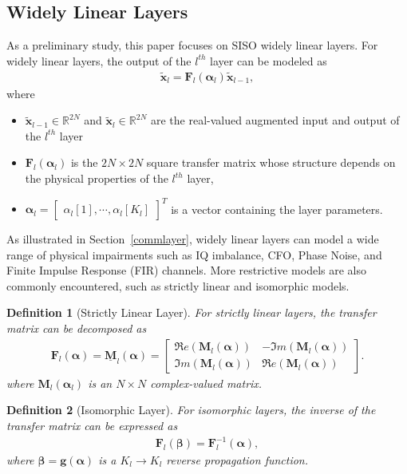 \documentclass{article}
\newtheorem{definition}{Definition}
\begin{document}
\subsection{Widely Linear Layers}

As a preliminary study, this paper focuses on SISO widely linear layers. For widely linear layers, the output of the $l^{th}$ layer can be modeled as
\begin{align}
\tilde{\mathbf{x}}_l = \mathbf{F}_l(\boldsymbol \alpha_l)\tilde{\mathbf{x}}_{l-1}\label{eqmod1},
\end{align}
where 
\begin{itemize}
\item $\tilde{\mathbf{x}}_{l-1}\in \mathbb{R}^{2N}$ and $\tilde{\mathbf{x}}_{l}\in \mathbb{R}^{2N}$ are the real-valued augmented input and output of the $l^{th}$ layer
\item $\mathbf{F}_l(\boldsymbol  \alpha_l)$ is the $2N\times 2N$ square transfer matrix whose structure depends on the physical properties of the $l^{th}$ layer,
\item $\boldsymbol  \alpha_l=\begin{bmatrix}\alpha_l[1],\cdots, \alpha_l[K_l]\end{bmatrix}^T$ is a vector containing the layer parameters.
\end{itemize}

As illustrated in Section~\ref{commlayer}, widely linear layers can model a wide range of physical impairments such as IQ imbalance, CFO, Phase Noise, and Finite Impulse Response (FIR) channels. More restrictive models are also commonly encountered, such as strictly linear and isomorphic models.

\begin{definition}[Strictly Linear Layer]
For strictly linear layers, the transfer matrix can be decomposed as
\begin{align}
\mathbf{F}_l(\boldsymbol \alpha)=\underline{\mathbf{M}}_l(\boldsymbol \alpha)=\begin{bmatrix}
\Re e(\mathbf{M}_l(\boldsymbol \alpha)) & -\Im m(\mathbf{M}_l(\boldsymbol \alpha)) \\
\Im m(\mathbf{M}_l(\boldsymbol \alpha)) &\Re e(\mathbf{M}_l(\boldsymbol \alpha)) 
\end{bmatrix}.
\end{align}
where $\mathbf{M}_l(\boldsymbol \alpha_l)$ is an $N\times N$ complex-valued matrix.
\end{definition}

\begin{definition}[Isomorphic Layer]\label{defiso}
For isomorphic layers, the inverse of the transfer matrix can be expressed as
\begin{align}
\mathbf{F}_l(\boldsymbol \beta)=\mathbf{F}^{-1}_l(\boldsymbol \alpha),\label{refiso}
\end{align}
where $\boldsymbol \beta=\mathbf{g}(\boldsymbol \alpha)$ is a $K_l \to K_l$ reverse propagation function. 
\end{definition}
\end{document}
